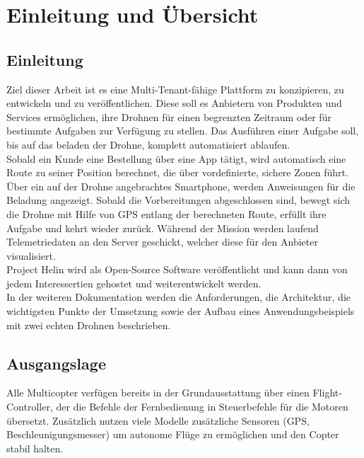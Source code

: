\chapter{Einleitung und Übersicht}

\section{Einleitung}

Ziel dieser Arbeit ist es eine Multi-Tenant-fähige Plattform zu konzipieren, zu entwickeln und zu veröffentlichen. Diese soll es Anbietern von Produkten und Services ermöglichen, ihre Drohnen für einen begrenzten Zeitraum oder für bestimmte Aufgaben zur Verfügung zu stellen. Das Ausführen einer Aufgabe soll, bis auf das beladen der Drohne, komplett automatisiert ablaufen. \\

Sobald ein Kunde eine Bestellung über eine App tätigt, wird automatisch eine Route zu seiner Position berechnet, die über vordefinierte, sichere Zonen führt. Über ein auf der Drohne angebrachtes Smartphone, werden Anweisungen für die Beladung angezeigt. Sobald die Vorbereitungen abgeschlossen sind, bewegt sich die Drohne mit Hilfe von GPS entlang der berechneten Route, erfüllt ihre Aufgabe und kehrt wieder zurück. Während der Mission werden laufend Telemetriedaten an den Server geschickt, welcher diese für den Anbieter visualisiert.\\

Project Helin wird als Open-Source Software veröffentlicht und kann dann von jedem Interessertien gehostet und weiterentwickelt werden.\\

In der weiteren Dokumentation werden die Anforderungen, die Architektur, die wichtigsten Punkte der Umsetzung sowie der Aufbau eines Anwendungsbeispiels mit zwei echten Drohnen beschrieben.

\section{Ausgangslage}

Alle Multicopter verfügen bereits in der Grundausstattung über einen \Gls{Flight-Controller}, der die Befehle der Fernbedienung in Steuerbefehle für die Motoren übersetzt. Zusätzlich nutzen viele Modelle zusätzliche Sensoren (GPS, Beschleunigungsmesser) um autonome Flüge zu ermöglichen und den Copter stabil halten. \\

